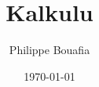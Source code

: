 \documentclass[a4paper, 11pt]{report}
\begin{document}
\title{Kalkulu}
\author{Philippe Bouafia}
\date{\today}

\maketitle{}
\tableofcontents{}


\end{document}
